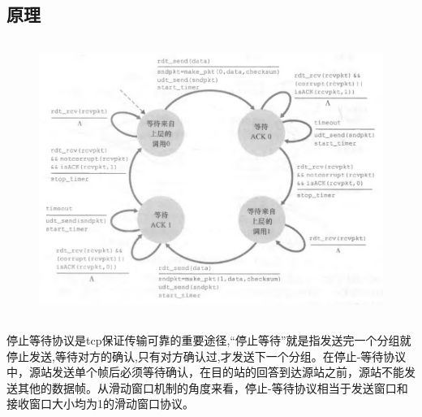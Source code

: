 \documentclass[UTF8,14pt]{article}
\numberwithin{figure}{section}
\begin{document}
\subsection{原理}
\vspace*{-0.5cm}
\begin{center}
      \begin{figure}[ht]
            \centering
            \includegraphics[width=12.6cm,height=9cm]{figures/abp.png}
      \end{figure}
\end{center}
\vspace*{-1cm}

停止等待协议是tcp保证传输可靠的重要途径,“停止等待”就是指发送完一个分组就停止发送,等待对方的确认,只有对方确认过,才发送下一个分组。在停止-等待协议中，源站发送单个帧后必须等待确认，在目的站的回答到达源站之前，源站不能发送其他的数据帧。从滑动窗口机制的角度来看，停止-等待协议相当于发送窗口和接收窗口大小均为1的滑动窗口协议。
\end{document}

